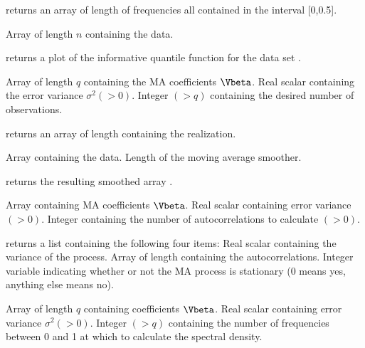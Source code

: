 \Sval
\Sitem{ }  returns an array of length {} of 
frequencies all contained in the interval [0,0.5].
%
%


\Sarg
{} Array of length $n$ containing the data.

\Sval
\Sitem{ }  returns a plot of the informative quantile 
function for the data set {}.
%
%


\Sarg
{} Array of length $q$ containing the MA coefficients $\Vbeta$.
 Real scalar containing the error variance $\sigma^2(>0)$.
 Integer $(>q)$ containing the desired number of observations.

\Sval
\Sitem{ }  returns an array {} of length {} 
containing the realization.
%
%


\Sarg
{} Array containing the data.
 Length of the moving average smoother.

\Sval
\Sitem{ }  returns the resulting smoothed array 
{}.
%
%



\Sarg
{} Array containing MA coefficients $\Vbeta$.
 Real scalar containing error variance $(>0)$.
 Integer containing the number of autocorrelations to 
calculate $(>0)$.

\Sval
\Sitem{ }  returns a list containing the following 
four items:
 Real scalar containing the variance of the process.
 Array of length {} containing the 
autocorrelations.
 Integer variable indicating whether or not the MA 
process is stationary (0 means yes, anything else means no).
%
%


\Sarg
{} Array of length $q$ containing coefficients $\Vbeta$.
 Real scalar containing error variance $\sigma^2(>0)$.
 Integer $(>q)$ containing the number of frequencies between 0
and 1 at which to calculate the spectral density. 

